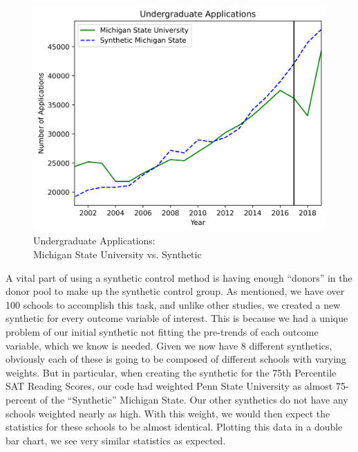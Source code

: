 \documentclass[a4paper,12pt]{article}
\begin{document}
\begin{figure}[h]
	{\centering
		\captionsetup{justification=centering}
		\includegraphics[scale=0.5]{msu_apps.png}
		\caption{Undergraduate Applications: \\ Michigan State University vs. Synthetic}}
\end{figure}
\pagebreak

\noindent A vital part of using a synthetic control method is having enough \enquote{donors} in the donor pool to make up the synthetic control group. As mentioned, we have over 100 schools to accomplish this task, and unlike other studies, we created a new synthetic for every outcome variable of interest. This is because we had a unique problem of our initial synthetic not fitting the pre-trends of each outcome variable, which we know is needed. Given we now have 8 different synthetics, obviously each of these is going to be composed of different schools with varying weights. But in particular, when creating the synthetic for the 75th Percentile SAT Reading Scores, our code had weighted Penn State University as almost 75-percent of the \enquote{Synthetic} Michigan State. Our other synthetics do not have any schools weighted nearly as high. With this weight, we would then expect the statistics for these schools to be almost identical. Plotting this data in a double bar chart, we see very similar statistics as expected.
\end{document}
